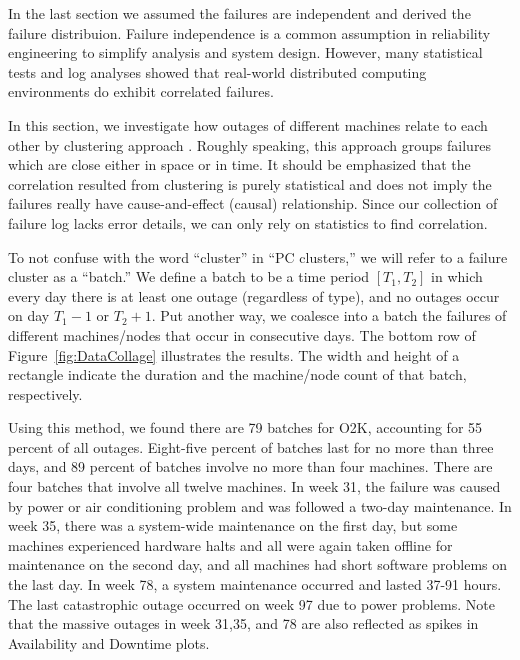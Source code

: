 \documentclass[10pt,twocolumn]{article}
\begin{document}
\label{s:corr}
In the last section we assumed the failures are
independent and derived the failure distribuion.
Failure independence is a common assumption in 
reliability engineering to simplify analysis
and system design. However, many statistical tests
and log analyses showed that real-world distributed 
computing environments do exhibit correlated 
failures. 

In this section, we investigate how outages 
of different machines relate to each other by 
clustering approach \cite{NTfailureAnalysis1}. Roughly 
speaking, this approach groups failures which are 
close either in space or in time. It should be 
emphasized that the correlation resulted from 
clustering is purely statistical and does not 
imply the failures really have cause-and-effect 
(causal) relationship. Since our collection of 
failure log lacks error details, we can only
rely on statistics to find correlation.

To not confuse with the word ``cluster'' in ``PC 
clusters,'' we will refer to a failure cluster as 
a ``batch.'' We define a batch to be a time 
period $[T_1,T_2]$ in which every day there is 
at least one outage (regardless of type), and 
no outages occur on day $T_1-1$ or $T_2+1$. 
Put another way, we coalesce into a batch the 
failures of different machines/nodes that occur 
in consecutive days. The bottom row of
Figure~\ref{fig:DataCollage} illustrates the 
results. The width and height of a rectangle
indicate the duration and the machine/node count
of that batch, respectively.

Using this method, we found there are 79 batches 
for O2K, accounting for 55 percent of all outages. 
Eight-five percent of batches last for no more than 
three days, and 89 percent of batches involve no
more than four machines. There are four batches
that involve all twelve machines. In week 31, the
failure was caused by power or air conditioning
problem and was followed a two-day maintenance.
In week 35, there was a system-wide maintenance 
on the first day, but some machines experienced 
hardware halts and all were again taken offline for 
maintenance on the second day, and all machines 
had short software problems on the last day. In week
78, a system maintenance occurred and lasted 37-91 
hours. The last catastrophic outage occurred on 
week 97 due to power problems. Note that the massive
outages in week 31,35, and 78 are also reflected
as spikes in Availability and Downtime plots.
\end{document}
